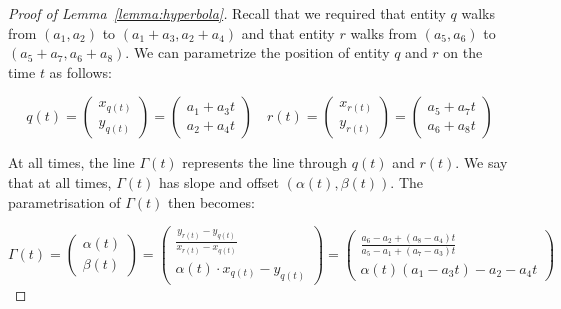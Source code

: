 \documentclass[UKenglish]{lipics-v2019}
\begin{document}
\begin{proof}[Proof of Lemma~\ref{lemma:hyperbola}]
Recall that we required that entity $q$ walks from $(a_1, a_2)$ to $(a_1 + a_3, a_2 + a_4)$ and that entity $r$ walks from $(a_5, a_6)$ to $(a_5 + a_7, a_6 + a_8)$. We can parametrize the position of entity $q$ and $r$ on the time $t$ as follows:

\begin{equation}
    \label{eq:line}
     q(t) = \left( \begin{array}{c}
         x_{q(t)}  \\
         y_{q(t)} 
    \end{array}  \right) = 
    \left( \begin{array}{c}
         a_1 + a_3 t \\
         a_2 + a_4 t
    \end{array}  \right)  \quad
      r(t) = \left( \begin{array}{c}
         x_{r(t)}  \\
         y_{r(t)} 
    \end{array}  \right) = 
    \left( \begin{array}{c}
         a_5 + a_7 t \\
         a_6 + a_8 t
    \end{array}  \right) 
\end{equation}


At all times, the line $\Gamma(t)$ represents the line through $q(t)$ and $r(t)$. We say that at all times, $\Gamma(t)$ has slope and offset $(\alpha(t), \beta(t))$. The parametrisation of $\Gamma(t)$ then becomes:

\begin{equation}
\label{eq:curve}
   \Gamma(t) = \left( \begin{array}{c}
         \alpha(t)  \\
         \beta(t) 
    \end{array}  \right) = 
    \left( \begin{array}{c}
         \frac{y_{r(t)} - y_{q(t)}}{x_{r(t)} - x_{q(t)}}  \\
         \alpha(t)\cdot x_{q(t)} - y_{q(t)}
    \end{array}  \right) =
    \left( \begin{array}{c}
         \frac{ a_6 - a_2 + (a_8 - a_4) t}
      { a_5 - a_1  + (a_7 - a_3) t }  \\
         \alpha(t) (a_1 - a_3 t) - a_2 - a_4 t 
    \end{array}  \right)
  \end{equation}
  

\end{proof}
\end{document}
